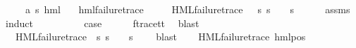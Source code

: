\begin{isabellebody}
\ \ \ {\isasymphi}\ {\isacharcolon}{\kern0pt}{\isacharcolon}{\kern0pt}\ {\isachardoublequoteopen}{\isacharparenleft}{\kern0pt}{\isacharprime}{\kern0pt}a{\isacharcomma}{\kern0pt}\ {\isacharprime}{\kern0pt}s{\isacharparenright}{\kern0pt}\ hml{\isachardoublequoteclose}\isanewline
\ \ \ {\isachardoublequoteopen}hml{\isacharunderscore}{\kern0pt}failure{\isacharunderscore}{\kern0pt}trace\ {\isasymphi}{\isachardoublequoteclose}\isanewline
\ \ \ {\isachardoublequoteopen}{\isasymexists}{\isasympsi}{\isachardot}{\kern0pt}\ HML{\isacharunderscore}{\kern0pt}failure{\isacharunderscore}{\kern0pt}trace\ {\isasympsi}\ {\isasymand}\ {\isacharparenleft}{\kern0pt}{\isasymforall}s{\isachardot}{\kern0pt}\ {\isacharparenleft}{\kern0pt}s\ {\isasymTurnstile}\ {\isasymphi}{\isacharparenright}{\kern0pt}\ {\isasymlongleftrightarrow}\ {\isacharparenleft}{\kern0pt}s\ {\isasymTurnstile}\ {\isasympsi}{\isacharparenright}{\kern0pt}{\isacharparenright}{\kern0pt}{\isachardoublequoteclose}\isanewline
\ \ \isamarkupfalse%
\ assms\ \isamarkupfalse%
\ induct\isanewline
\ \ \isamarkupfalse%
\ {}\isanewline
\ \ \isamarkupfalse%
\ \isamarkupfalse%
\ {\isacharquery}{\kern0pt}case\isanewline
\ \ \ \ \isamarkupfalse%
\ f{\isacharunderscore}{\kern0pt}trace{\isacharunderscore}{\kern0pt}tt\ \isamarkupfalse%
\ blast\isanewline
{}\isamarkupfalse%
\isanewline
\ \ \isamarkupfalse%
\ {\isacharparenleft}{\kern0pt}{}\ {\isasymphi}\ {\isasymalpha}{\isacharparenright}{\kern0pt}\isanewline
\ \ \isamarkupfalse%
\ \isamarkupfalse%
\ {\isasympsi}\ \ {\isachardoublequoteopen}HML{\isacharunderscore}{\kern0pt}failure{\isacharunderscore}{\kern0pt}trace\ {\isasympsi}{\isachardoublequoteclose}\ {\isachardoublequoteopen}{\isacharparenleft}{\kern0pt}{\isasymforall}s{\isachardot}{\kern0pt}\ {\isacharparenleft}{\kern0pt}s\ {\isasymTurnstile}\ {\isasymphi}{\isacharparenright}{\kern0pt}\ {\isacharequal}{\kern0pt}\ {\isacharparenleft}{\kern0pt}s\ {\isasymTurnstile}\ {\isasympsi}{\isacharparenright}{\kern0pt}{\isacharparenright}{\kern0pt}{\isachardoublequoteclose}\ \isamarkupfalse%
\ blast\isanewline
\ \ \isamarkupfalse%
\ {\isachardoublequoteopen}HML{\isacharunderscore}{\kern0pt}failure{\isacharunderscore}{\kern0pt}trace\ {\isacharparenleft}{\kern0pt}hml{\isacharunderscore}{\kern0pt}pos\ {\isasymalpha}\ {\isasympsi}{\isacharparenright}{\kern0pt}{\isachardoublequoteclose}\ \isanewline

\end{isabellebody}
